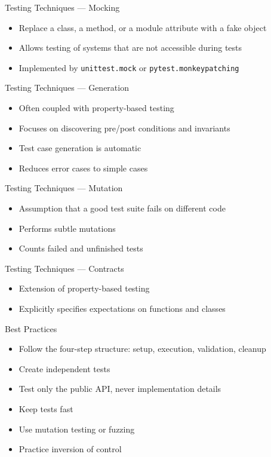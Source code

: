   \begin{frame}{Testing Techniques --- Mocking}
  \begin{itemize}[<+->]
  \item Replace a class, a method, or a module attribute with a fake object
  \item Allows testing of systems that are not accessible during tests
  \item Implemented by \texttt{unittest.mock} or \texttt{pytest.monkeypatching}
  \end{itemize}
  
  \end{frame}
  
  \begin{frame}{Testing Techniques --- Generation}
  \begin{itemize}[<+->]
  \item Often coupled with property-based testing
  \item Focuses on discovering pre/post conditions and invariants
  \item Test case generation is automatic
  \item Reduces error cases to simple cases
  \end{itemize}
  \end{frame}
  
  \begin{frame}{Testing Techniques --- Mutation}
  \begin{itemize}[<+->]
  \item Assumption that a good test suite fails on different code
  \item Performs subtle mutations
  \item Counts failed and unfinished tests
  \end{itemize}
  \end{frame}
  
  \begin{frame}{Testing Techniques --- Contracts}
  \begin{itemize}[<+->]
  \item Extension of property-based testing
  \item Explicitly specifies expectations on functions and classes
  \end{itemize}
  
  \end{frame}
  
  \begin{frame}{Best Practices}
  \begin{itemize}[<+->]
  \item Follow the four-step structure: setup, execution, validation, cleanup
  \item Create independent tests
  \item Test only the public API, never implementation details
  \item Keep tests fast
  \item Use mutation testing or fuzzing
  \item Practice inversion of control
  \end{itemize}
  \end{frame}
  
